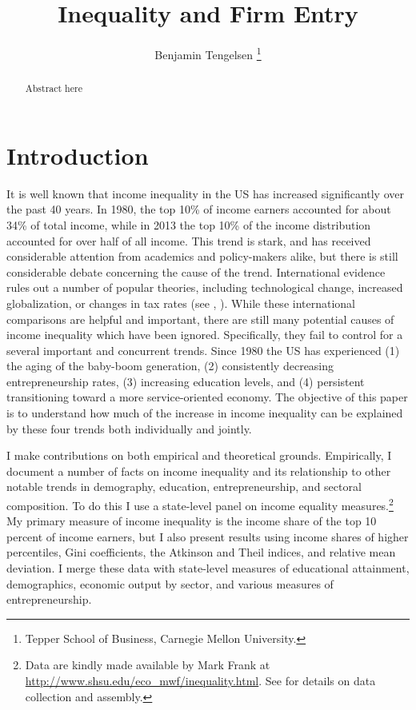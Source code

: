 \documentclass[11pt]{article}
\theoremstyle{definition}
\numberwithin{equation}{section}
\begin{document}
\title{Inequality and Firm Entry }
\author{ Benjamin Tengelsen%
\thanks{%
Tepper School of Business, Carnegie Mellon University.}}
\maketitle

\begin{abstract}
Abstract here
\end{abstract}

\newpage{} \onehalfspacing


\section{Introduction}
It is well known that income inequality in the US has increased significantly over the past 40 years. In 1980, the top 10\% of income earners accounted for about 34\% of total income, while in 2013 the top 10\% of the income distribution accounted for over half of all income. This trend is stark, and has received considerable attention from academics and policy-makers alike, but there is still considerable debate concerning the cause of the trend. International evidence rules out a number of popular theories, including technological change, increased globalization, or changes in tax rates (see \cite{piketty2003income}, \cite{atkinson2011top}). While these international comparisons are helpful and important, there are still many potential causes of income inequality which have been ignored. Specifically, they fail to control for a several important and concurrent trends. Since 1980 the US has experienced (1) the aging of the baby-boom generation, (2) consistently decreasing entrepreneurship rates, (3) increasing education levels, and (4) persistent transitioning toward a more service-oriented economy. The objective of this paper is to understand how much of the increase in income inequality can be explained by these four trends both individually and jointly. 

I make contributions on both empirical and theoretical grounds. Empirically, I document a number of facts on income inequality and its relationship to other notable trends in demography, education, entrepreneurship, and sectoral composition. To do this I use a state-level panel on income equality measures.\footnote{ Data are kindly made available by Mark Frank at \href{http://www.shsu.edu/eco_mwf/inequality.html}{http://www.shsu.edu/eco\_mwf/inequality.html}. See \cite{frank2009inequality} for details on data collection and assembly. }  
My primary measure of income inequality is the income share of the top 10 percent of income earners, but I also present results using income shares of higher percentiles, Gini coefficients, the Atkinson and Theil indices, and relative mean deviation. I merge these data with state-level measures of educational attainment, demographics, economic output by sector, and various measures of entrepreneurship.
\end{document}
